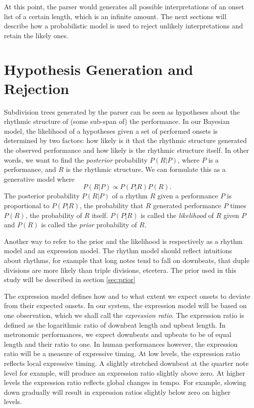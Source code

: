 At this point, the parser would generates all possible interpretations of an onset list of a certain length, which is an infinite amount. The next sections will describe how a probabilistic model is used to reject unlikely interpretations and retain the likely ones.

\section{Hypothesis Generation and Rejection}
\label{sec:rejection}

Subdivision trees generated by the parser can be seen as hypotheses about the rhythmic structure of (some sub-span of) the performance. In our Bayesian model, the likelihood of a hypotheses given a set of performed onsets is determined by two factors: how likely is it that the rhythmic structure generated the observed performance and how likely is the rhythmic structure itself. In other words, we want to find the \textit{posterior} probability $P(R|P)$, where $P$ is a performance, and $R$ is the rhythmic structure. We can formulate this as a generative model where
\begin{equation}
\label{eq:model}
P(R|P) \propto P(P|R)P(R).
\end{equation}
The posterior probability $P(R|P)$ of a rhythm $R$ given a performance $P$ is proportional to $P(P|R)$, the probability that $R$ generated performance $P$ times $P(R)$, the probability of $R$ itself. $P(P|R)$ is called the \textit{likelihood} of $R$ given $P$ and $P(R)$ is called the \textit{prior} probability of $R$.

Another way to refer to the prior and the likelihood is respectively as a rhythm model and an expression model. The rhythm model should reflect intuitions about rhythms, for example that long notes tend to fall on downbeats, that duple divisions are more likely than triple divisions, etcetera. The prior used in this study will be described in section \ref{sec:prior}

The expression model defines how and to what extent we expect onsets to deviate from their expected onsets. In our system, the expression model will be based on one observation, which we shall call the \textit{expression ratio}. The expression ratio is defined as the logarithmic ratio of downbeat length and upbeat length. In metronomic performances, we expect downbeats and upbeats to be of equal length and their ratio to one. In human performances however, the expression ratio will be a measure of expressive timing. At low levels, the expression ratio reflects local expressive timing. A slightly stretched downbeat at the quarter note level for example, will produce an expression ratio slightly above zero. At higher levels the expression ratio reflects global changes in tempo. For example, slowing down gradually will result in expression ratios slightly below zero on higher levels.

